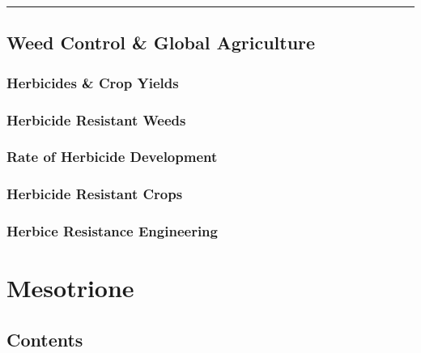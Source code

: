 \begin{center}\rule{0.5\linewidth}{0.5pt}\end{center}

\hypertarget{weed-control-global-agriculture}{%
\subsection{Weed Control \& Global
Agriculture}\label{weed-control-global-agriculture}}

\hypertarget{herbicides-crop-yields}{%
\subsubsection{Herbicides \& Crop Yields}\label{herbicides-crop-yields}}

\hypertarget{herbicide-resistant-weeds}{%
\subsubsection{Herbicide Resistant
Weeds}\label{herbicide-resistant-weeds}}

\hypertarget{rate-of-herbicide-development}{%
\subsubsection{Rate of Herbicide
Development}\label{rate-of-herbicide-development}}

\hypertarget{herbicide-resistant-crops}{%
\subsubsection{Herbicide Resistant
Crops}\label{herbicide-resistant-crops}}

\hypertarget{herbice-resistance-engineering}{%
\subsubsection{Herbice Resistance
Engineering}\label{herbice-resistance-engineering}}

\hypertarget{mesotrione}{%
\section{Mesotrione}\label{mesotrione}}

\hypertarget{contents-3}{%
\subsection{Contents}\label{contents-3}}

